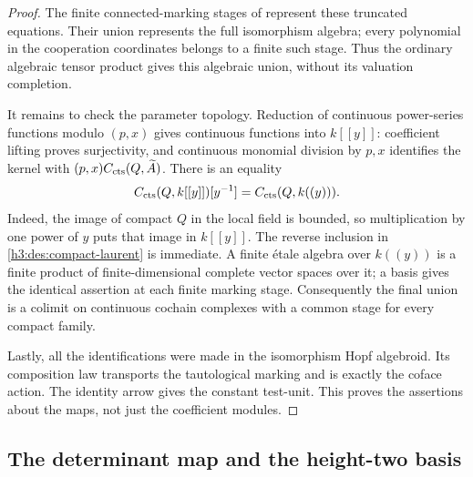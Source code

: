 \begin{proof}
The finite connected-marking stages of
 represent
these truncated equations.  Their union represents the full
isomorphism algebra; every polynomial in the cooperation
coordinates belongs to a finite such stage.  Thus the ordinary
algebraic tensor product gives this algebraic union, without its
valuation completion.

It remains to check the parameter topology.  Reduction of
continuous power-series functions modulo \((p,x)\) gives
continuous functions into \(k[[y]]\): coefficient lifting proves
surjectivity, and continuous monomial division by \(p,x\) identifies
the kernel with \((p,x)C_{\mathrm{cts}}(Q,\widetilde A)\).
There is an equality
\begin{equation}\label{h3:des:compact-laurent}
 C_{\mathrm{cts}}(Q,k[[y]])[y^{-1}]
   = C_{\mathrm{cts}}(Q,k((y))).
\end{equation}
Indeed, the image of compact \(Q\) in the local field is bounded,
so multiplication by one power of \(y\) puts that image in
\(k[[y]]\).  The reverse inclusion in
\eqref{h3:des:compact-laurent} is immediate.  A finite étale
algebra over \(k((y))\) is a finite product of finite-dimensional
complete vector spaces over it; a basis gives the identical
assertion at each finite marking stage.  Consequently the final
union is a colimit on continuous cochain complexes with a common
stage for every compact family.

Lastly, all the identifications were made in the isomorphism
Hopf algebroid.  Its composition law transports the tautological
marking and is exactly the coface action.  The identity arrow
gives the constant test-unit.  This proves the assertions about
the maps, not just the coefficient modules.
\end{proof}

\subsection{The determinant map and the height-two basis}

